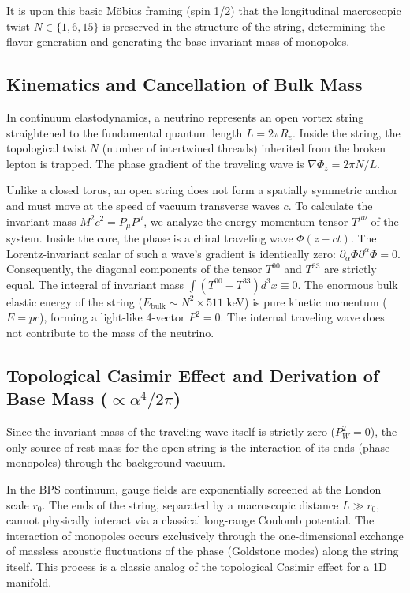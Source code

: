 \documentclass[11pt,a4paper]{article}
\begin{document}
It is upon this basic Möbius framing (spin 1/2) that the longitudinal macroscopic twist $N \in \{1, 6, 15\}$ is preserved in the structure of the string, determining the flavor generation and generating the base invariant mass of monopoles.
	
\subsection{Kinematics and Cancellation of Bulk Mass}
	In continuum elastodynamics, a neutrino represents an open vortex string straightened to the fundamental quantum length $L = 2\pi R_e$. Inside the string, the topological twist $N$ (number of intertwined threads) inherited from the broken lepton is trapped. The phase gradient of the traveling wave is $\nabla \Phi_z = 2\pi N / L$.
	
	Unlike a closed torus, an open string does not form a spatially symmetric anchor and must move at the speed of vacuum transverse waves $c$. To calculate the invariant mass $M^2 c^2 = P_\mu P^\mu$, we analyze the energy-momentum tensor $T^{\mu\nu}$ of the system.
	Inside the core, the phase is a chiral traveling wave $\Phi(z-ct)$. The Lorentz-invariant scalar of such a wave's gradient is identically zero: $\partial_\alpha \Phi \partial^\alpha \Phi = 0$. 
	Consequently, the diagonal components of the tensor $T^{00}$ and $T^{33}$ are strictly equal. The integral of invariant mass $\int (T^{00} - T^{33}) d^3x \equiv 0$. The enormous bulk elastic energy of the string ($E_{\text{bulk}} \sim N^2 \times 511$ keV) is pure kinetic momentum ($E = pc$), forming a light-like 4-vector $P^2 = 0$. The internal traveling wave does not contribute to the mass of the neutrino.
	
\subsection{Topological Casimir Effect and Derivation of Base Mass ($\propto \alpha^4 / 2\pi$)}
	Since the invariant mass of the traveling wave itself is strictly zero ($P_W^2 = 0$), the only source of rest mass for the open string is the interaction of its ends (phase monopoles) through the background vacuum. 
	
	In the BPS continuum, gauge fields are exponentially screened at the London scale $r_0$. The ends of the string, separated by a macroscopic distance $L \gg r_0$, cannot physically interact via a classical long-range Coulomb potential. The interaction of monopoles occurs exclusively through the one-dimensional exchange of massless acoustic fluctuations of the phase (Goldstone modes) along the string itself. This process is a classic analog of the topological Casimir effect for a 1D manifold.
	
\end{document}
